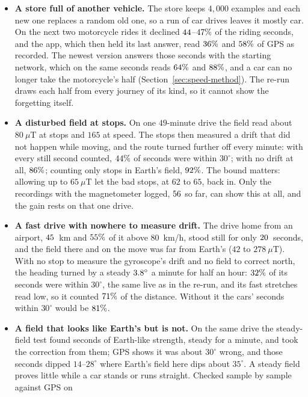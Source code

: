 \documentclass[11pt]{article}
\newcommand{\dg}{^\circ}
\begin{document}
\begin{itemize}
new turns have been learned.
\item \textbf{A store full of another vehicle.} The store keeps $4{,}000$ examples and each new one
replaces a random old one, so a run of car drives leaves it mostly car. On the next two motorcycle
rides it declined $44$--$47\%$ of the riding seconds, and the app, which then held its last
answer, read $36\%$ and $58\%$ of GPS as recorded. The newest version answers those seconds
with the starting network, which on the same seconds reads $64\%$ and $88\%$, and a car can no
longer take the motorcycle's half (Section~\ref{sec:speed-method}). The re-run draws each half from every
journey of its kind, so it cannot show the forgetting itself.
\item \textbf{A disturbed field at stops.} On one $49$-minute drive the field read about $80~\mu$T at stops
and $165$ at speed. The stops then measured a drift that did not happen while moving, and the route turned
further off every minute: with every still second counted, $44\%$ of seconds were within $30\dg$; with no drift
at all, $86\%$; counting only stops in Earth's field, $92\%$. The bound matters: allowing up to $65~\mu$T let
the bad stops, at $62$ to $65$, back in. Only the recordings with the magnetometer logged, $56$ so far, can show
this at all, and the gain rests on that one drive.
\item \textbf{A fast drive with nowhere to measure drift.} The drive home from an airport, $45$~km and
$55\%$ of it above $80$~km/h, stood still for only $20$~seconds, and the field there and on the move
was far from Earth's ($42$ to $278~\mu$T). With no stop to measure the gyroscope's drift and no field to correct
north, the heading turned by a steady $\nFastDriveDrift\dg$ a minute for half an hour: $32\%$ of its seconds were
within $30\dg$, the same live as in the re-run, and its fast stretches read low, so it counted $71\%$ of the
distance. Without it the cars' seconds within $30\dg$ would be $81\%$.
\item \textbf{A field that looks like Earth's but is not.} On the same drive the steady-field test found
seconds of Earth-like strength, steady for a minute, and took the correction from them; GPS shows it was
about $30\dg$ wrong, and those seconds dipped $14$--$28\dg$ where Earth's field here dips about $35\dg$. A
steady field proves little while a car stands or runs straight. Checked sample by sample against GPS on

\end{itemize}
\end{document}
